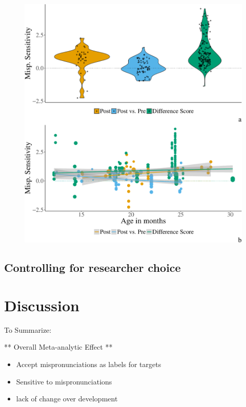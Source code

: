 \documentclass[man]{apa6}
\providecommand{\tightlist}{%
  \setlength{\itemsep}{0pt}\setlength{\parskip}{0pt}}
\theoremstyle{definition}
\theoremstyle{definition}
\theoremstyle{definition}
\theoremstyle{remark}
\begin{document}
\begin{figure}[htbp]
\centering
\includegraphics{Paper_Analyses_files/figure-latex/Plot_Within_cond_age_diff_score-1.pdf}
\caption{}
\end{figure}

\subsection{Controlling for researcher
choice}\label{controlling-for-researcher-choice}

\section{Discussion}\label{discussion}

To Summarize:

** Overall Meta-analytic Effect **

\begin{itemize}
\tightlist
\item
  Accept mispronunciations as labels for targets
\item
  Sensitive to mispronunciations
\item
  lack of change over development
\end{itemize}
\end{document}
